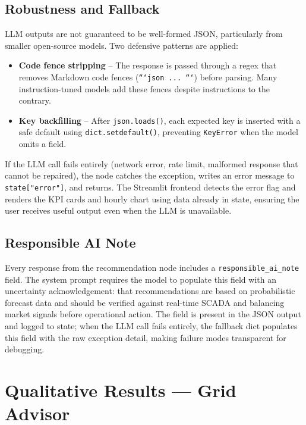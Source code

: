 \documentclass[12pt, a4paper]{article}
\begin{document}
\clearpage
\subsection{Robustness and Fallback}

LLM outputs are not guaranteed to be well-formed JSON, particularly from smaller open-source models. Two defensive patterns are applied:

\begin{itemize}[noitemsep]
    \item \textbf{Code fence stripping} -- The response is passed through a regex that removes Markdown code fences (\texttt{```json ... ```}) before parsing. Many instruction-tuned models add these fences despite instructions to the contrary.
    \item \textbf{Key backfilling} -- After \texttt{json.loads()}, each expected key is inserted with a safe default using \texttt{dict.setdefault()}, preventing \texttt{KeyError} when the model omits a field.
\end{itemize}

If the LLM call fails entirely (network error, rate limit, malformed response that cannot be repaired), the node catches the exception, writes an error message to \texttt{state["error"]}, and returns. The Streamlit frontend detects the error flag and renders the KPI cards and hourly chart using data already in state, ensuring the user receives useful output even when the LLM is unavailable.

\subsection{Responsible AI Note}

Every response from the recommendation node includes a \texttt{responsible\_ai\_note} field. The system prompt requires the model to populate this field with an uncertainty acknowledgement: that recommendations are based on probabilistic forecast data and should be verified against real-time SCADA and balancing market signals before operational action. The field is present in the JSON output and logged to state; when the LLM call fails entirely, the fallback dict populates this field with the raw exception detail, making failure modes transparent for debugging.

\newpage
\section{Qualitative Results --- Grid Advisor}
\label{sec:qualitative}
\end{document}
